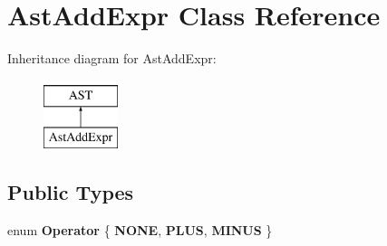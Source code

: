 \hypertarget{classAstAddExpr}{\section{Ast\-Add\-Expr Class Reference}
\label{classAstAddExpr}
}
Inheritance diagram for Ast\-Add\-Expr\-:\begin{figure}[H]
\begin{center}
\leavevmode
\includegraphics[height=2.000000cm]{classAstAddExpr}
\end{center}
\end{figure}
\subsection*{Public Types}
\begin{DoxyCompactItemize}
\item 
enum {\bfseries Operator} \{ {\bfseries N\-O\-N\-E}, 
{\bfseries P\-L\-U\-S}, 
{\bfseries M\-I\-N\-U\-S}
 \}
\end{DoxyCompactItemize}
